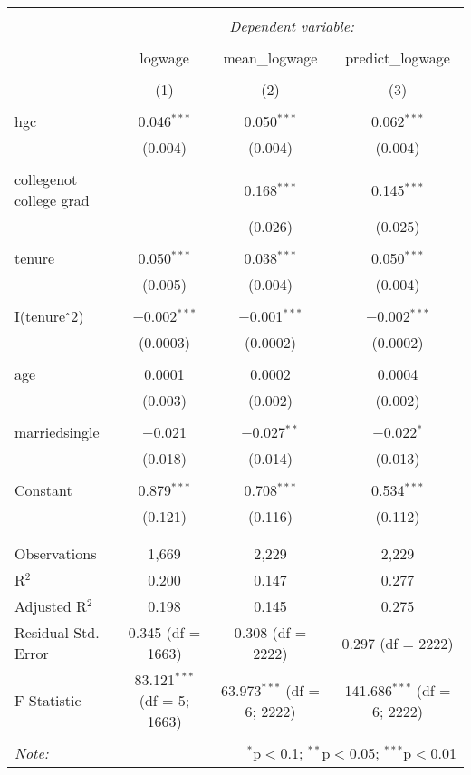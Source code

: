 \documentclass{article}
\begin{document}
\begin{table}[!htbp] \centering 
  \caption{} 
  \label{} 
\begin{tabular}{@{\extracolsep{5pt}}lccc} 
\\[-1.8ex]\hline 
\hline \\[-1.8ex] 
 & \multicolumn{3}{c}{\textit{Dependent variable:}} \\ 
\cline{2-4} 
\\[-1.8ex] & logwage & mean\_logwage & predict\_logwage \\ 
\\[-1.8ex] & (1) & (2) & (3)\\ 
\hline \\[-1.8ex] 
 hgc & 0.046$^{***}$ & 0.050$^{***}$ & 0.062$^{***}$ \\ 
  & (0.004) & (0.004) & (0.004) \\ 
  & & & \\ 
 collegenot college grad &  & 0.168$^{***}$ & 0.145$^{***}$ \\ 
  &  & (0.026) & (0.025) \\ 
  & & & \\ 
 tenure & 0.050$^{***}$ & 0.038$^{***}$ & 0.050$^{***}$ \\ 
  & (0.005) & (0.004) & (0.004) \\ 
  & & & \\ 
 I(tenure$\hat{\mkern6mu}$2) & $-$0.002$^{***}$ & $-$0.001$^{***}$ & $-$0.002$^{***}$ \\ 
  & (0.0003) & (0.0002) & (0.0002) \\ 
  & & & \\ 
 age & 0.0001 & 0.0002 & 0.0004 \\ 
  & (0.003) & (0.002) & (0.002) \\ 
  & & & \\ 
 marriedsingle & $-$0.021 & $-$0.027$^{**}$ & $-$0.022$^{*}$ \\ 
  & (0.018) & (0.014) & (0.013) \\ 
  & & & \\ 
 Constant & 0.879$^{***}$ & 0.708$^{***}$ & 0.534$^{***}$ \\ 
  & (0.121) & (0.116) & (0.112) \\ 
  & & & \\ 
\hline \\[-1.8ex] 
Observations & 1,669 & 2,229 & 2,229 \\ 
R$^{2}$ & 0.200 & 0.147 & 0.277 \\ 
Adjusted R$^{2}$ & 0.198 & 0.145 & 0.275 \\ 
Residual Std. Error & 0.345 (df = 1663) & 0.308 (df = 2222) & 0.297 (df = 2222) \\ 
F Statistic & 83.121$^{***}$ (df = 5; 1663) & 63.973$^{***}$ (df = 6; 2222) & 141.686$^{***}$ (df = 6; 2222) \\ 
\hline 
\hline \\[-1.8ex] 
\textit{Note:}  & \multicolumn{3}{r}{$^{*}$p$<$0.1; $^{**}$p$<$0.05; $^{***}$p$<$0.01} \\ 
\end{tabular} 
\end{table} 
\end{document}
